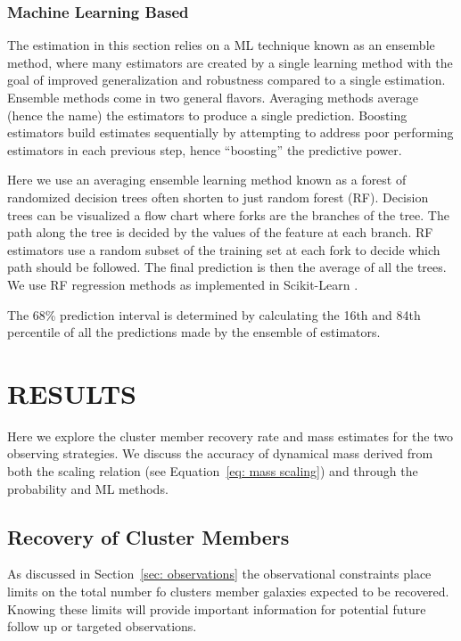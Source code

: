 \documentclass[apj, revtex4]{emulateapj}
\begin{document}
\subsubsection{Machine Learning Based}
The estimation in this section relies on a ML technique known as an ensemble method, where many estimators are created by a single learning method with the goal of improved generalization and robustness compared to a single estimation. Ensemble methods come in two general flavors. Averaging methods average (hence the name) the estimators to produce a single prediction. Boosting estimators build estimates sequentially by attempting to address poor performing estimators in each previous step, hence ``boosting'' the predictive power.

Here we use an averaging ensemble learning method known as a forest of randomized decision trees often shorten to just random forest (RF). Decision trees can be visualized a flow chart where forks are the branches of the tree. The path along the tree is decided by the values of the feature at each branch. RF estimators use a random subset of the training set at each fork to decide which path should be followed. The final prediction is then the average of all the trees. We use RF regression methods as implemented in {\sc Scikit-Learn} \citep{Pedregosa2012}.

The 68\% prediction interval is determined by calculating the 16th and 84th percentile of all the predictions made by the ensemble of estimators.

\section{RESULTS}\label{sec: results}
Here we explore the cluster member recovery rate and mass estimates for the two observing strategies. We discuss the accuracy of dynamical mass derived from both the scaling relation (see Equation~\ref{eq: mass scaling}) and through the probability and ML methods.

\subsection{Recovery of Cluster Members}
As discussed in Section~\ref{sec: observations} the observational constraints place limits on the total number fo clusters member galaxies expected to be recovered. Knowing these limits will provide important information for potential future follow up or targeted observations. 
\end{document}
